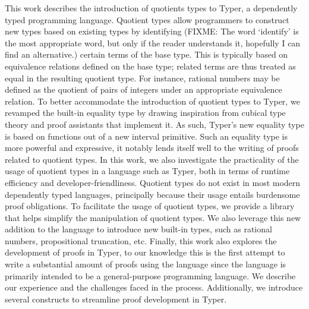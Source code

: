 \documentclass[12pt,twoside,maitrise]{dms}
\theoremstyle{definition}
\numberwithin{equation}{section}
\numberwithin{table}{chapter}
\numberwithin{figure}{chapter}
\begin{document}
This work describes the introduction of quotients types to Typer, a dependently
typed programming language. Quotient types allow programmers to construct new
types based on existing types by identifying (FIXME: The word `identify'
is the most appropriate word, but only if the reader understands it, hopefully I
can find an alternative.) certain terms of the base type. This is typically
based on equivalence relations defined on the base type; related terms are thus
treated as equal in the resulting quotient type. For instance, rational numbers
may be defined as the quotient of pairs of integers under an appropriate
equivalence relation. To better accommodate the introduction of quotient types to
Typer, we revamped the built-in equality type by drawing inspiration from
cubical type theory and proof assistants that implement it. As such, Typer's new
equality type is based on functions out of a new interval primitive. Such an
equality type is more powerful and expressive, it notably lends itself well to
the writing of proofs related to quotient types. In this work, we also
investigate the practicality of the usage of quotient types in a language such
as Typer, both in terms of runtime efficiency and developer-friendliness.
Quotient types do not exist in most modern dependently typed languages,
principally because their usage entails burdensome proof obligations. To
facilitate the usage of quotient types, we provide a library that helps simplify
the manipulation of quotient types. We also leverage this new addition to the
language to introduce new built-in types, such as rational numbers,
propositional truncation, etc. Finally, this work also explores the development
of proofs in Typer, to our knowledge this is the first attempt to write a
substantial amount of proofs using the language since the language is primarily
intended to be a general-purpose programming language. We describe our
experience and the challenges faced in the process. Additionally, we introduce
several constructs to streamline proof development in Typer.


\end{document}
